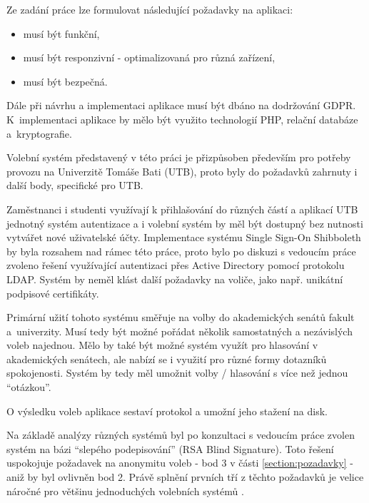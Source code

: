 

Ze zadání práce lze formulovat následující požadavky na aplikaci:

\begin{itemize}
	\item musí být funkční,
	\item musí být responzivní - optimalizovaná pro různá zařízení,
	\item musí být bezpečná.
\end{itemize}

Dále při návrhu a implementaci aplikace musí být dbáno na dodržování GDPR. K~implementaci aplikace by mělo být využito technologií PHP, relační databáze a~kryptografie.

Volební systém představený v této práci je přizpůsoben především pro potřeby provozu na Univerzitě Tomáše Bati (UTB), proto byly do požadavků zahrnuty i další body, specifické pro UTB. 

Zaměstnanci i studenti využívají k přihlašování do různých částí a aplikací UTB jednotný systém autentizace a i volební systém by měl být dostupný bez nutnosti vytvářet nové uživatelské účty. Implementace systému Single Sign-On Shibboleth by byla rozsahem nad rámec této práce, proto bylo po diskuzi s vedoucím práce zvoleno řešení využívající autentizaci přes Active Directory pomocí protokolu LDAP. Systém by neměl klást další požadavky na voliče, jako např. unikátní podpisové certifikáty.

Primární užití tohoto systému směřuje na volby do akademických senátů fakult a~univerzity. Musí tedy být možné pořádat několik samostatných a nezávislých voleb najednou. Mělo by také být možné systém využít pro hlasování v akademických senátech, ale nabízí se i využití pro různé formy dotazníků spokojenosti. Systém by tedy měl umožnit volby / hlasování s více než jednou ``otázkou''.

O výsledku voleb aplikace sestaví protokol a umožní jeho stažení na disk.

Na základě analýzy různých systémů byl po konzultaci s vedoucím práce zvolen systém na bázi ``slepého podepisování'' (RSA Blind Signature)\cite{chaum}. Toto řešení uspokojuje požadavek na anonymitu voleb - bod 3 v části \ref{section:pozadavky} - aniž by byl ovlivněn bod 2. Právě splnění prvních tří z těchto požadavků je velice náročné pro většinu jednoduchých volebních systémů \cite{Schneier1996}.

